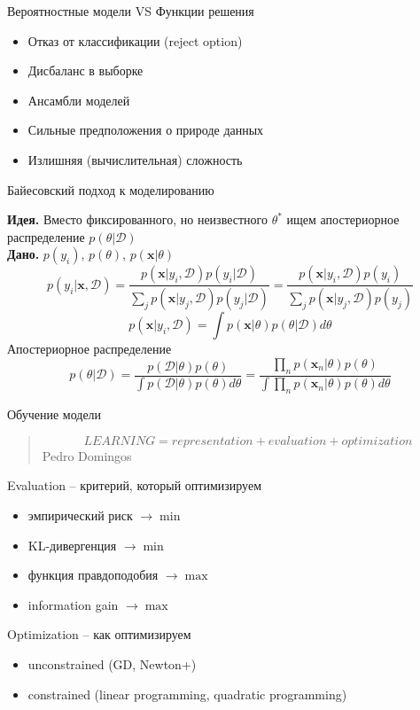 \documentclass[10pt]{beamer}
\begin{document}
\begin{frame}{Вероятностные модели VS Функции решения}

\begin{itemize}
\item[\color{green}\ding{108}] Отказ от классификации (reject option)
\item[\color{green}\ding{108}] Дисбаланс в выборке
\item[\color{green}\ding{108}] Ансамбли моделей
\item[\color{red}\ding{108}] Сильные предположения о природе данных
\item[\color{red}\ding{108}] Излишняя (вычислительная) сложность
\end{itemize}

\end{frame}

\begin{frame}{Байесовский подход к моделированию}

{\bf Идея.} Вместо фиксированного, но неизвестного $\theta^*$ ищем апостериорное распределение $p(\theta | \mathcal{D})$\\ 
{\bf Дано.} $p(y_i)$, $p(\theta)$, $p(\mathbf{x} | \theta)$ 
\[
p(y_i | \mathbf{x}, \mathcal{D})= \frac{p(\mathbf{x} | y_i, \mathcal{D}) p(y_i | \mathcal{D})}{\sum_jp(\mathbf{x} | y_j, \mathcal{D}) p(y_j | \mathcal{D})} = \frac{p(\mathbf{x} | y_i, \mathcal{D}) p(y_i)}{\sum_jp(\mathbf{x} | y_j, \mathcal{D}) p(y_j)}
\]
\[
p(\mathbf{x} | y_i, \mathcal{D}) = \int p(\mathbf{x} | \theta) p(\theta | \mathcal{D}) d\theta
\]
Апостериорное распределение
\[
p(\theta | \mathcal{D}) = \frac{p(\mathcal{D} | \theta) p(\theta)}{\int p(\mathcal{D} | \theta) p(\theta) d\theta} = \frac{\prod_n p(\mathbf{x}_n | \theta) p(\theta)}{\int \prod_n p(\mathbf{x}_n | \theta) p(\theta) d\theta}
\]

\end{frame}

\begin{frame}{Обучение модели}

\begin{quote}
\[
LEARNING = representation + evaluation + optimization
\]
\hfill Pedro Domingos
\end{quote}

Evaluation -- критерий, который оптимизируем
\begin{itemize}
\item эмпирический риск $\rightarrow \min$
\item KL-дивергенция $\rightarrow \min$
\item функция правдоподобия $\rightarrow \max$
\item information gain $\rightarrow \max$
\end{itemize}
Optimization -- как оптимизируем
\begin{itemize}
\item unconstrained (GD, Newton+)
\item constrained (linear programming, quadratic programming)
\end{itemize}

\end{frame}
\end{document}
